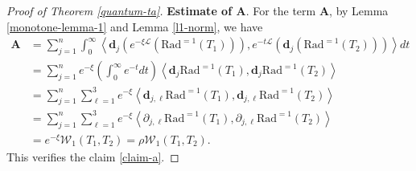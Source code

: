 \documentclass{amsbook}
\theoremstyle{definition}
\theoremstyle{remark}
\numberwithin{section}{chapter}
\numberwithin{equation}{chapter}
\newcommand{\1}{\mathbf{1}}
\newcommand{\La}{\mathcal{L}}
\newcommand{\dc}{\mathbf{d}}
\begin{document}
\begin{proof}[Proof of Theorem \ref{quantum-ta}]
	
	{\bf Estimate of $\mathbf{A}$}. For the term $\mathbf{A}$, by Lemma \ref{monotone-lemma-1} and Lemma \ref{l1-norm}, we have
	\begin{align*}
			\mathbf{A}
			&=\sum_{j=1}^{n}\int_{0}^{\infty}\left\langle \dc_{j}\left(e^{-\xi\La}\left(\mathrm{Rad}^{=1}(T_1)\right)\right),e^{-t\La}\left(\dc_{j}(\mathrm{Rad}^{=1}(T_2))\right)\right\rangle dt\\
			&=\sum_{j=1}^{n}e^{-\xi}\left(\int_{0}^{\infty}e^{-t}dt\right)\left\langle \dc_{j}\mathrm{Rad}^{=1}(T_1),\dc_{j}\mathrm{Rad}^{=1}(T_2)\right\rangle\\
			&=\sum_{j=1}^{n}\sum_{\ell=1}^{3}e^{-\xi}\left\langle \dc_{j,\ell}\mathrm{Rad}^{=1}(T_1),\dc_{j,\ell}\mathrm{Rad}^{=1}(T_2)\right\rangle\\
            &=\sum_{j=1}^{n}\sum_{\ell=1}^{3}e^{-\xi}\left\langle \partial_{j,\ell}\mathrm{Rad}^{=1}(T_1),\partial_{j,\ell}\mathrm{Rad}^{=1}(T_2)\right\rangle\\
			&=e^{-\xi}\mathcal{W}_1(T_1,T_2)=\rho \mathcal{W}_1(T_1,T_2).
		\end{align*}
This verifies the claim \eqref{claim-a}.


\end{proof}
\end{document}

